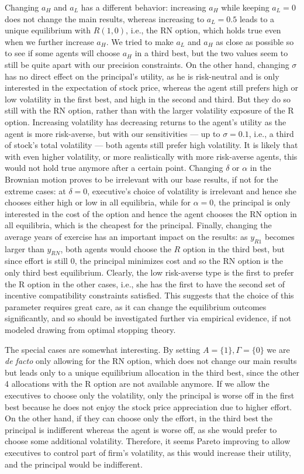 Changing $a_H$ and $a_L$ has a different behavior: increasing $a_H$ while keeping $a_L=0$ does not change the main results, whereas increasing to $a_L=0.5$ leads to a unique equilibrium with $R(1,0)$, i.e., the RN option, which holds true even when we further increase $a_H$. We tried to make $a_L$ and $a_H$ as close as possible so to see if some agents will choose $a_H$ in a third best, but the two values seem to still be quite apart with our precision constraints. On the other hand, changing $\sigma$ has no direct effect on the principal's utility, as he is risk-neutral and is only interested in the expectation of stock price, whereas the agent still prefers high or low volatility in the first best, and high in the second and third. But they do so still with the RN option, rather than with the larger volatility exposure of the R option. Increasing volatility has decreasing returns to the agent's utility as the agent is more risk-averse, but with our sensitivities --- up to $\sigma = 0.1$, i.e., a third of stock's total volatility --- both agents still prefer high volatility. It is likely that with even higher volatility, or more realistically with more risk-averse agents, this would not hold true anymore after a certain point. Changing $\delta$ or $\alpha$ in the Brownian motion proves to be irrelevant with our base results, if not for the extreme cases: at $\delta = 0$, executive's choice of volatility is irrelevant and hence she chooses either high or low in all equilibria, while for $\alpha = 0$, the principal is only interested in the cost of the option and hence the agent chooses the RN option in all equilibria, which is the cheapest for the principal. Finally, changing the average years of exercise has an important impact on the results: as $y_{R1}$ becomes larger than $y_{RN}$, both agents would choose the $R$ option in the third best, but since effort is still 0, the principal minimizes cost and so the RN option is the only third best equilibrium. Clearly, the low risk-averse type is the first to prefer the R option in the other cases, i.e., she has the first to have the second set of incentive compatibility constraints satisfied. This suggests that the choice of this parameter requires great care, as it can change the equilibrium outcomes significantly, and so should be investigated further via empirical evidence, if not modeled drawing from optimal stopping theory. 

The special cases are somewhat interesting. By setting $A = \{1\}, \Gamma = \{0\}$ we are \textit{de facto} only allowing for the RN option, which does not change our main results but leads only to a unique equilibrium allocation in the third best, since the other 4 allocations with the R option are not available anymore. If we allow the executives to choose only the volatility, only the principal is worse off in the first best because he does not enjoy the stock price appreciation due to higher effort. On the other hand, if they can choose only the effort,  in the third best the principal is indifferent whereas the agent is worse off, as she would prefer to choose some additional volatility. Therefore, it seems Pareto improving to allow executives to control part of firm's volatility, as this would increase their utility, and the principal would be indifferent. 

